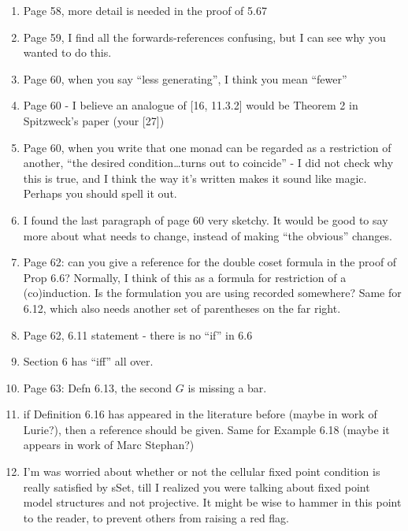 \documentclass{article}
\begin{document}
\begin{enumerate}
\item
Page 58, more detail is needed in the proof of 5.67

\item
Page 59, I find all the forwards-references confusing, but I can see why you wanted to do this.

\item
Page 60, when you say ``less generating'', I think you mean ``fewer''

\item
Page 60 - I believe an analogue of [16, 11.3.2] would be Theorem 2 in Spitzweck's paper (your [27])

\item
Page 60, when you write that one monad can be regarded as a restriction of another, ``the desired condition\dots turns out to coincide'' - I did not check why this is true, and I think the way it's written makes it sound like magic. Perhaps you should spell it out.

\item
I found the last paragraph of page 60 very sketchy. It would be good to say more about what needs to change, instead of making ``the obvious'' changes.

\item
Page 62: can you give a reference for the double coset formula in the proof of Prop 6.6? Normally, I think of this as a formula for restriction of a (co)induction. Is the formulation you are using recorded somewhere?
Same for 6.12, which also needs another set of parentheses on the far right.

\item
Page 62, 6.11 statement - there is no ``if'' in 6.6

\item
Section 6 has ``iff'' all over.

\item
Page 63: Defn 6.13, the second $G$ is missing a bar.


\item if Definition 6.16 has appeared in the literature before (maybe in work of Lurie?), then a reference should be given. Same for Example 6.18 (maybe it appears in work of Marc Stephan?)

\item I'm was worried about whether or not the cellular fixed point condition is really satisfied by sSet, till I realized you were talking about fixed point model structures and not projective. It might be wise to hammer in this point to the reader, to prevent others from raising a red flag.


\end{enumerate}
\end{document}
